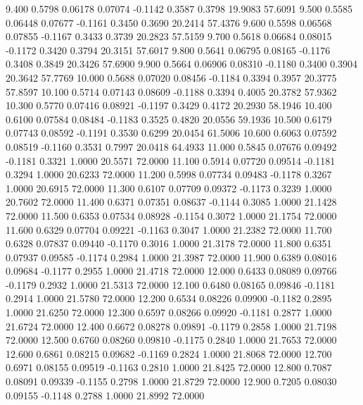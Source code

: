    9.400   0.5798   0.06178   0.07074  -0.1142   0.3587   0.3798  19.9083  57.6091
   9.500   0.5585   0.06448   0.07677  -0.1161   0.3450   0.3690  20.2414  57.4376
   9.600   0.5598   0.06568   0.07855  -0.1167   0.3433   0.3739  20.2823  57.5159
   9.700   0.5618   0.06684   0.08015  -0.1172   0.3420   0.3794  20.3151  57.6017
   9.800   0.5641   0.06795   0.08165  -0.1176   0.3408   0.3849  20.3426  57.6900
   9.900   0.5664   0.06906   0.08310  -0.1180   0.3400   0.3904  20.3642  57.7769
  10.000   0.5688   0.07020   0.08456  -0.1184   0.3394   0.3957  20.3775  57.8597
  10.100   0.5714   0.07143   0.08609  -0.1188   0.3394   0.4005  20.3782  57.9362
  10.300   0.5770   0.07416   0.08921  -0.1197   0.3429   0.4172  20.2930  58.1946
  10.400   0.6100   0.07584   0.08484  -0.1183   0.3525   0.4820  20.0556  59.1936
  10.500   0.6179   0.07743   0.08592  -0.1191   0.3530   0.6299  20.0454  61.5006
  10.600   0.6063   0.07592   0.08519  -0.1160   0.3531   0.7997  20.0418  64.4933
  11.000   0.5845   0.07676   0.09492  -0.1181   0.3321   1.0000  20.5571  72.0000
  11.100   0.5914   0.07720   0.09514  -0.1181   0.3294   1.0000  20.6233  72.0000
  11.200   0.5998   0.07734   0.09483  -0.1178   0.3267   1.0000  20.6915  72.0000
  11.300   0.6107   0.07709   0.09372  -0.1173   0.3239   1.0000  20.7602  72.0000
  11.400   0.6371   0.07351   0.08637  -0.1144   0.3085   1.0000  21.1428  72.0000
  11.500   0.6353   0.07534   0.08928  -0.1154   0.3072   1.0000  21.1754  72.0000
  11.600   0.6329   0.07704   0.09221  -0.1163   0.3047   1.0000  21.2382  72.0000
  11.700   0.6328   0.07837   0.09440  -0.1170   0.3016   1.0000  21.3178  72.0000
  11.800   0.6351   0.07937   0.09585  -0.1174   0.2984   1.0000  21.3987  72.0000
  11.900   0.6389   0.08016   0.09684  -0.1177   0.2955   1.0000  21.4718  72.0000
  12.000   0.6433   0.08089   0.09766  -0.1179   0.2932   1.0000  21.5313  72.0000
  12.100   0.6480   0.08165   0.09846  -0.1181   0.2914   1.0000  21.5780  72.0000
  12.200   0.6534   0.08226   0.09900  -0.1182   0.2895   1.0000  21.6250  72.0000
  12.300   0.6597   0.08266   0.09920  -0.1181   0.2877   1.0000  21.6724  72.0000
  12.400   0.6672   0.08278   0.09891  -0.1179   0.2858   1.0000  21.7198  72.0000
  12.500   0.6760   0.08260   0.09810  -0.1175   0.2840   1.0000  21.7653  72.0000
  12.600   0.6861   0.08215   0.09682  -0.1169   0.2824   1.0000  21.8068  72.0000
  12.700   0.6971   0.08155   0.09519  -0.1163   0.2810   1.0000  21.8425  72.0000
  12.800   0.7087   0.08091   0.09339  -0.1155   0.2798   1.0000  21.8729  72.0000
  12.900   0.7205   0.08030   0.09155  -0.1148   0.2788   1.0000  21.8992  72.0000
